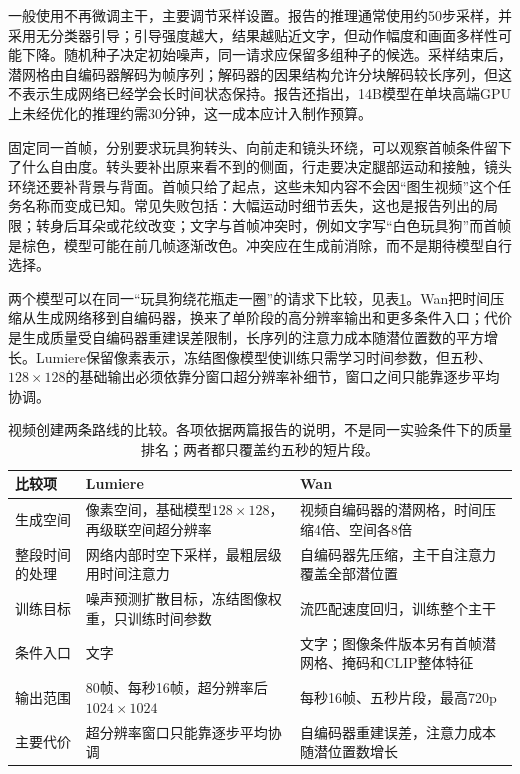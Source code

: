 一般使用不再微调主干，主要调节采样设置。报告的推理通常使用约50步采样，并采用无分类器引导；引导强度越大，结果越贴近文字，但动作幅度和画面多样性可能下降。随机种子决定初始噪声，同一请求应保留多组种子的候选。采样结束后，潜网格由自编码器解码为帧序列；解码器的因果结构允许分块解码较长序列，但这不表示生成网络已经学会长时间状态保持。报告还指出，14B模型在单块高端GPU上未经优化的推理约需30分钟，这一成本应计入制作预算。

固定同一首帧，分别要求玩具狗转头、向前走和镜头环绕，可以观察首帧条件留下了什么自由度。转头要补出原来看不到的侧面，行走要决定腿部运动和接触，镜头环绕还要补背景与背面。首帧只给了起点，这些未知内容不会因“图生视频”这个任务名称而变成已知。常见失败包括：大幅运动时细节丢失，这也是报告列出的局限；转身后耳朵或花纹改变；文字与首帧冲突时，例如文字写“白色玩具狗”而首帧是棕色，模型可能在前几帧逐渐改色。冲突应在生成前消除，而不是期待模型自行选择。

两个模型可以在同一“玩具狗绕花瓶走一圈”的请求下比较，见表\ref{tab:vision-video-creation-compare}。Wan把时间压缩从生成网络移到自编码器，换来了单阶段的高分辨率输出和更多条件入口；代价是生成质量受自编码器重建误差限制，长序列的注意力成本随潜位置数的平方增长。Lumiere保留像素表示，冻结图像模型使训练只需学习时间参数，但五秒、$128\times128$的基础输出必须依靠分窗口超分辨率补细节，窗口之间只能靠逐步平均协调。

\begin{table}[tbp]
 \centering
 \small
 \begin{tabularx}{\linewidth}{@{}p{24mm}XX@{}}
  \toprule
  比较项 & Lumiere & Wan \\
  \midrule
  生成空间 & 像素空间，基础模型$128\times128$，再级联空间超分辨率 & 视频自编码器的潜网格，时间压缩4倍、空间各8倍 \\
  整段时间的处理 & 网络内部时空下采样，最粗层级用时间注意力 & 自编码器先压缩，主干自注意力覆盖全部潜位置 \\
  训练目标 & 噪声预测扩散目标，冻结图像权重，只训练时间参数 & 流匹配速度回归，训练整个主干 \\
  条件入口 & 文字 & 文字；图像条件版本另有首帧潜网格、掩码和CLIP整体特征 \\
  输出范围 & 80帧、每秒16帧，超分辨率后$1024\times1024$ & 每秒16帧、五秒片段，最高720p \\
  主要代价 & 超分辨率窗口只能靠逐步平均协调 & 自编码器重建误差，注意力成本随潜位置数增长 \\
  \bottomrule
 \end{tabularx}
 \caption{视频创建两条路线的比较。各项依据两篇报告的说明，不是同一实验条件下的质量排名；两者都只覆盖约五秒的短片段。}
 \label{tab:vision-video-creation-compare}
\end{table}
\FloatBarrier

